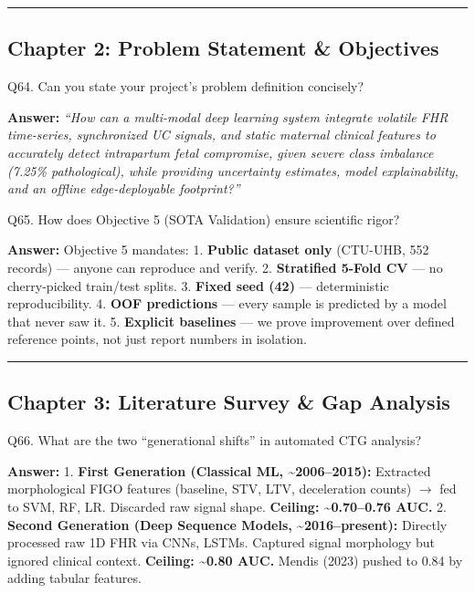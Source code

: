 \documentclass[11pt,a4paper]{article}
\begin{document}
\begin{center}\rule{0.5\linewidth}{0.5pt}\end{center}

\subsection{Chapter 2: Problem Statement \&
Objectives}\label{chapter-2-problem-statement-objectives}

\begin{questionbox}
Q64. Can you state your project's problem definition
concisely?
\end{questionbox}
\textbf{Answer:} \emph{``How can a multi-modal deep learning system integrate
volatile FHR time-series, synchronized UC signals, and static maternal
clinical features to accurately detect intrapartum fetal compromise,
given severe class imbalance (7.25\% pathological), while providing
uncertainty estimates, model explainability, and an offline
edge-deployable footprint?''}

\begin{questionbox}
Q65. How does Objective 5 (SOTA Validation) ensure scientific
rigor?
\end{questionbox}
\textbf{Answer:} Objective 5 mandates: 1. \textbf{Public dataset only}
(CTU-UHB, 552 records) --- anyone can reproduce and verify. 2.
\textbf{Stratified 5-Fold CV} --- no cherry-picked train/test splits. 3.
\textbf{Fixed seed (42)} --- deterministic reproducibility. 4.
\textbf{OOF predictions} --- every sample is predicted by a model that
never saw it. 5. \textbf{Explicit baselines} --- we prove improvement
over defined reference points, not just report numbers in isolation.

\begin{center}\rule{0.5\linewidth}{0.5pt}\end{center}

\subsection{Chapter 3: Literature Survey \& Gap
Analysis}\label{chapter-3-literature-survey-gap-analysis}

\begin{questionbox}
Q66. What are the two ``generational shifts'' in automated CTG
analysis?
\end{questionbox}
\textbf{Answer:} 1. \textbf{First Generation (Classical ML,
\textasciitilde2006--2015):} Extracted morphological FIGO features
(baseline, STV, LTV, deceleration counts) $\rightarrow$ fed to SVM, RF, LR.
Discarded raw signal shape. \textbf{Ceiling: \textasciitilde0.70--0.76
AUC.} 2. \textbf{Second Generation (Deep Sequence Models,
\textasciitilde2016--present):} Directly processed raw 1D FHR via CNNs,
LSTMs. Captured signal morphology but ignored clinical context.
\textbf{Ceiling: \textasciitilde0.80 AUC.} Mendis (2023) pushed to 0.84
by adding tabular features.
\end{document}
